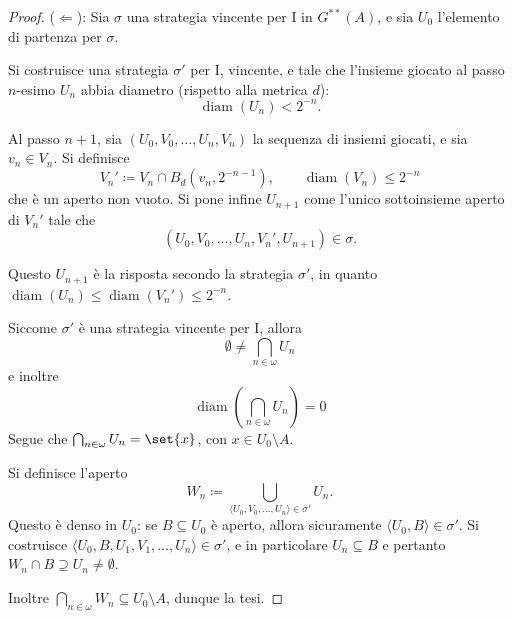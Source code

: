 \documentclass[titlepage]{article}
\newcommand{\1}{\mathds{1}}
\theoremstyle{definition}%
\theoremstyle{plain}
\theoremstyle{remark}
\begin{document}
\begin{proof}
(\(\Leftarrow\)): Sia \(\sigma\) una strategia vincente per I in \(G^{**}(A)\), e sia \(U_{0}\) l'elemento di partenza per \(\sigma\).

Si costruisce una strategia \(\sigma'\) per I, vincente, e tale che l'insieme giocato al passo \(n\)-esimo \(U_{n}\) abbia diametro (rispetto alla metrica \(d\)):
\begin{equation*}
\operatorname{diam}(U_{n})<2^{-n}.
\end{equation*}

Al passo \(n+1\), sia \((U_{0},V_{0},\dots,U_{n}, V_{n})\) la sequenza di insiemi giocati, e sia \(v_{n} \in V_{n}\). Si definisce
\begin{equation*}
V_{n}'\coloneqq V_{n}\cap B_{d}(v_{n}, 2^{-n-1}), \qquad \operatorname{diam}(V_{n}) \le 2^{-n}
\end{equation*}
che è un aperto non vuoto. Si pone infine \(U_{n+1}\) come l'unico sottoinsieme aperto di \(V_{n}'\) tale che
\begin{equation*}
(U_{0},V_{0},\dots,U_{n}, V_{n}', U_{n+1}) \in \sigma.
\end{equation*}

Questo \(U_{n+1}\) è la risposta secondo la strategia \(\sigma'\), in quanto \(\operatorname{diam}(U_{n})\le \operatorname{diam}(V_{n}')\le 2^{-n}\).

Siccome \(\sigma'\) è una strategia vincente per I, allora
\begin{equation*}
\emptyset\neq\bigcap_{n \in \omega} U_{n}
\end{equation*}
e inoltre
\begin{equation*}
\operatorname{diam}\left(\bigcap_{n \in \omega} U_{n}\right) = 0
\end{equation*}
Segue che \(\bigcap_{n \in \omega} U_{n} = \set{x}\), con \(x \in U_{0}\setminus A\).

Si definisce l'aperto
\begin{equation*}
W_{n} \coloneqq \bigcup_{\langle U_{0},V_{0},\dots,U_{n}\rangle \in \sigma'} U_{n}.
\end{equation*}
Questo è denso in \(U_{0}\): se \(B \subseteq U_{0}\) è aperto, allora sicuramente \(\langle U_{0},B\rangle \in \sigma'\). Si costruisce \(\langle U_{0},B,U_{1},V_{1},\dots,U_{n}\rangle \in \sigma'\), e in particolare \(U_{n} \subseteq B\) e pertanto \(W_{n}\cap B\supseteq U_{n}\neq\emptyset\).

Inoltre \(\bigcap_{n \in \omega} W_{n} \subseteq U_{0}\setminus A\), dunque la tesi.
\end{proof}
\end{document}
